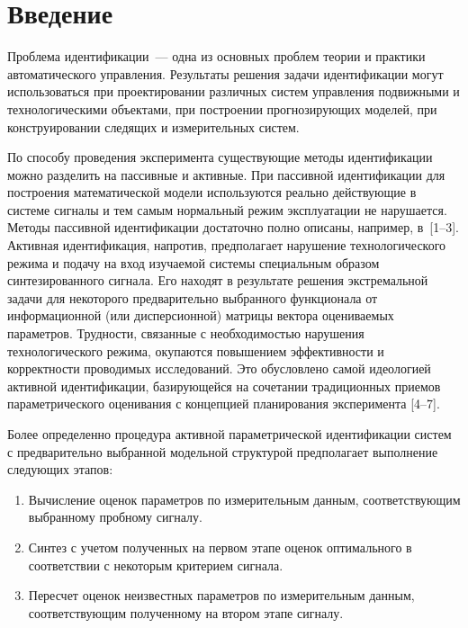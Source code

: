       \begin{multicols}{2}

            \label{st\stat}

\section{Введение}

  Проблема идентификации~--- одна из основных проблем теории и практики
автоматического управ\-ле\-ния. Результаты решения задачи идентификации могут
использоваться при проектировании различных систем управления
подвижными и технологическими объектами, при построении прогнозирующих
моделей, при конструировании следящих и измерительных систем.

  По способу проведения эксперимента существующие методы идентификации
можно разделить на пассивные и активные. При пассивной идентификации для
построения математической модели используются реально действующие в
системе сигналы и тем самым нормальный режим эксплуатации не нарушается.
Методы пассивной идентификации достаточно полно описаны, например,
  в~[1--3]. Активная идентификация, напротив, предполагает нарушение
технологического режима и подачу на вход изучаемой системы специальным
образом синтезированного сигнала. Его находят в результате решения
экстремальной задачи для некоторого предварительно выбранного
функционала от информационной (или дисперсионной) матрицы вектора
оцениваемых параметров. Трудности, связанные с необходимостью нарушения
технологического режима, окупаются повышением эффективности и
корректности проводимых исследований. Это обусловлено самой идеологией
активной идентификации, базирующейся на сочетании традиционных приемов
параметрического оценивания с концепцией планирования эксперимента [4--7].

  Более определенно процедура активной параметрической идентификации
систем с предварительно выбранной модельной структурой предполагает
выполнение следующих этапов:
  \begin{enumerate}[1.]
\item Вычисление оценок параметров по измерительным данным,
соответствующим выбранному пробному сигналу.
\item Синтез с учетом полученных на первом этапе оценок оптимального в
соответствии с некоторым критерием сигнала.
\item Пересчет оценок неизвестных параметров по измерительным данным,
соответствующим полученному на втором этапе сигналу.
\end{enumerate}


\end{multicols}

